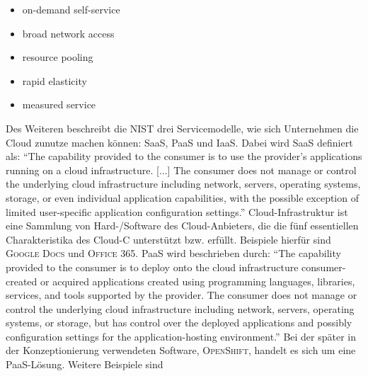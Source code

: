 \begin{itemize}
	\item on-demand self-service
	\item broad network access
	\item resource pooling
	\item rapid elasticity
	\item measured service
\end{itemize}
Des Weiteren beschreibt die \ac{NIST} drei Servicemodelle, wie sich Unternehmen die Cloud zunutze machen können: \ac{SaaS}, \ac{PaaS} und \ac{IaaS}. Dabei wird \ac{SaaS} definiert als: \enquote{The capability  provided to the consumer is to use the provider’s applications running on a cloud infrastructure. [...] The consumer does not manage or control the underlying cloud infrastructure including network, servers, operating systems, storage, or even individual application capabilities, with the possible exception of limited user-specific application configuration settings.}\autocite[][S.2]{mell_nist_2011} Cloud-Infrastruktur ist eine Sammlung von Hard-/Software des Cloud-Anbieters, die die fünf essentiellen Charakteristika des \ac{Cloud-C} unterstützt bzw. erfüllt. Beispiele hierfür sind \textsc{Google Docs} und \textsc{Office 365}. \ac{PaaS} wird beschrieben durch: \enquote{The capability provided to the consumer is to deploy onto the cloud infrastructure consumer-created or acquired applications created using programming languages, libraries, services, and tools supported by the provider. The consumer does
not manage or control the underlying cloud infrastructure including network, servers, operating systems, or storage, but has control over the deployed applications and possibly configuration settings for the application-hosting environment.}\autocite[][S.2]{mell_nist_2011} Bei der später in der Konzeptionierung verwendeten Software, \textsc{OpenShift}, handelt es sich um eine \ac{PaaS}-Lösung. Weitere Beispiele sind 
